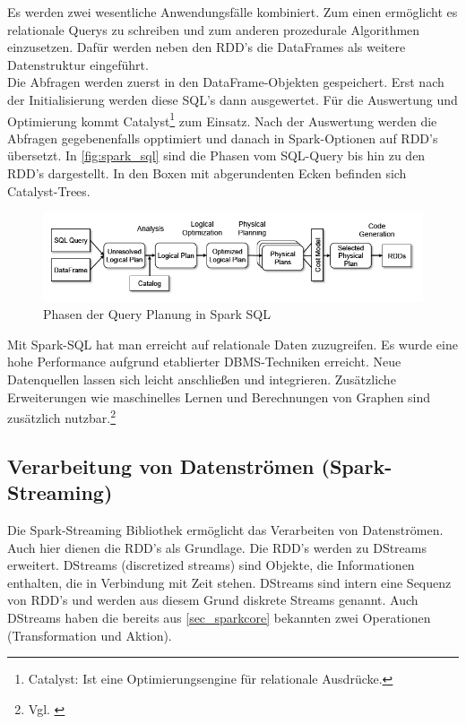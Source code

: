 \noindent
Es werden zwei wesentliche Anwendungsfälle kombiniert. Zum einen ermöglicht es relationale Querys zu schreiben und zum anderen prozedurale Algorithmen einzusetzen. 
Dafür werden neben den RDD's die DataFrames als weitere Datenstruktur eingeführt.\\

\noindent
Die Abfragen werden zuerst in den DataFrame-Objekten gespeichert. Erst nach der Initialisierung werden diese SQL's dann ausgewertet. Für die Auswertung und Optimierung kommt Catalyst\footnote{Catalyst: Ist eine Optimierungsengine für relationale Ausdrücke.} zum Einsatz. Nach der Auswertung werden die Abfragen gegebenenfalls opptimiert und danach in Spark-Optionen auf RDD's übersetzt. In \autoref{fig:spark_sql} sind die Phasen vom SQL-Query bis hin zu den RDD's dargestellt. In den Boxen mit abgerundenten Ecken befinden sich Catalyst-Trees.

\begin{figure}[h]
  \centering
  \includegraphics[width=\textwidth]{./bilder/spark_sql.png}
  \caption{Phasen der Query Planung in Spark SQL \cite{AXL+15}}\label{fig:spark_sql}
\end{figure}

\noindent
Mit Spark-SQL hat man erreicht auf relationale Daten zuzugreifen. Es wurde eine hohe Performance aufgrund etablierter DBMS-Techniken erreicht.
Neue Datenquellen lassen sich leicht anschließen und integrieren.
Zusätzliche Erweiterungen wie maschinelles Lernen und Berechnungen von Graphen sind zusätzlich nutzbar.\footnote{Vgl. \cite{AXL+15}} \\

\newpage
\subsection{Verarbeitung von Datenströmen (Spark-Streaming)}


Die Spark-Streaming Bibliothek ermöglicht das Verarbeiten von Datenströmen. Auch hier dienen die RDD's als Grundlage. Die RDD's werden zu DStreams erweitert. DStreams (discretized streams) sind Objekte, die Informationen enthalten, die in Verbindung mit Zeit stehen. DStreams sind intern eine Sequenz von RDD's und werden aus diesem Grund diskrete Streams genannt.
Auch DStreams haben die bereits aus \ref{sec_sparkcore} bekannten zwei Operationen (Transformation und Aktion). \\

